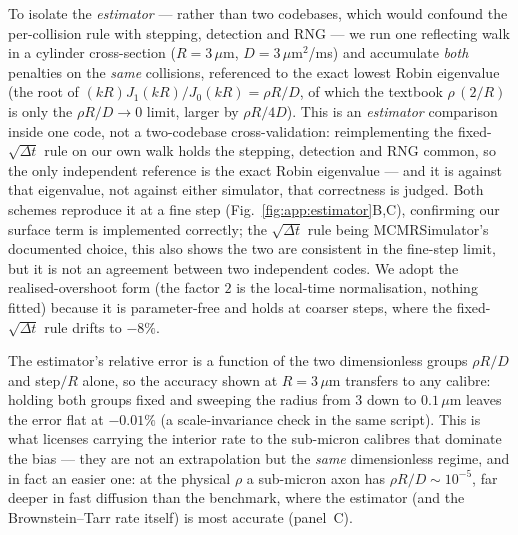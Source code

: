 To isolate the \emph{estimator} --- rather than two codebases, which would confound the
per-collision rule with stepping, detection and RNG --- we run one reflecting walk in a cylinder
cross-section ($R=3\,\mu$m, $D=3\,\mu$m$^2$/ms) and accumulate \emph{both} penalties on the
\emph{same} collisions, referenced to the exact lowest Robin eigenvalue (the root of
$(kR)J_1(kR)/J_0(kR)=\rho R/D$, of which the textbook $\rho\,(2/R)$ is only the
$\rho R/D\!\to\!0$ limit, larger by $\rho R/4D$). This is an \emph{estimator} comparison inside
one code, not a two-codebase cross-validation: reimplementing the fixed-$\sqrt{\Delta t}$ rule on
our own walk holds the stepping, detection and RNG common, so the only independent reference is
the exact Robin eigenvalue --- and it is against that eigenvalue, not against either simulator,
that correctness is judged. Both schemes reproduce it at a fine step
(Fig.~\ref{fig:app:estimator}B,C), confirming our surface term is implemented correctly; the
$\sqrt{\Delta t}$ rule being MCMRSimulator's documented choice, this also shows the two are
consistent in the fine-step limit, but it is not an agreement between two independent codes. We
adopt the realised-overshoot form (the factor $2$ is the local-time normalisation, nothing
fitted) because it is parameter-free and holds at coarser steps, where the fixed-$\sqrt{\Delta t}$
rule drifts to $-8\%$.

The estimator's relative error is a function of the two dimensionless groups $\rho R/D$ and
step$/R$ alone, so the accuracy shown at $R=3\,\mu$m transfers to any calibre: holding both
groups fixed and sweeping the radius from $3$ down to $0.1\,\mu$m leaves the error flat at
$-0.01\%$ (a scale-invariance check in the same script). This is what licenses carrying the
interior rate to the sub-micron calibres that dominate the bias --- they are not an
extrapolation but the \emph{same} dimensionless regime, and in fact an easier one: at the
physical $\rho$ a sub-micron axon has $\rho R/D\!\sim\!10^{-5}$, far deeper in fast diffusion
than the benchmark, where the estimator (and the Brownstein--Tarr rate itself) is most accurate
(panel~C).

